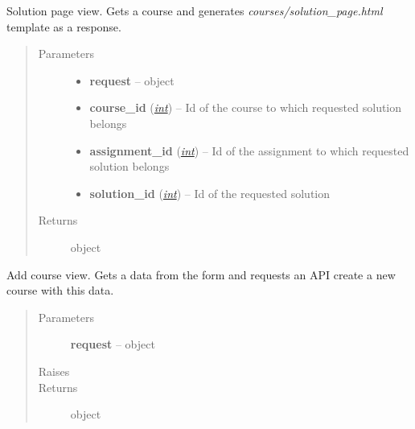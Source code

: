 \documentclass[letterpaper,10pt,english]{sphinxmanual}
\begin{document}
\begin{fulllineitems}
\label{web_portal:core.courses.views.solution_page}
Solution page view. Gets a course and generates \emph{courses/solution\_page.html}
template as a response.
\begin{quote}\begin{description}
\item[{Parameters}] \leavevmode\begin{itemize}
\item {} 
\textbf{request} --  object

\item {} 
\textbf{course\_id} (\href{http://docs.python.org/library/functions.html\#int}{\emph{int}}) -- Id of the course to which requested solution belongs

\item {} 
\textbf{assignment\_id} (\href{http://docs.python.org/library/functions.html\#int}{\emph{int}}) -- Id of the assignment to which requested solution belongs

\item {} 
\textbf{solution\_id} (\href{http://docs.python.org/library/functions.html\#int}{\emph{int}}) -- Id of the requested solution

\end{itemize}

\item[{Returns}] \leavevmode
{} object

\end{description}\end{quote}

\end{fulllineitems}


\begin{fulllineitems}
\label{web_portal:core.courses.views.add_course}
Add course view. Gets a data from the form and requests an API create a
new course with this data.
\begin{quote}\begin{description}
\item[{Parameters}] \leavevmode
\textbf{request} --  object

\item[{Raises}] \leavevmode
{}

\item[{Returns}] \leavevmode
{} object

\end{description}\end{quote}

\end{fulllineitems}
\end{document}
